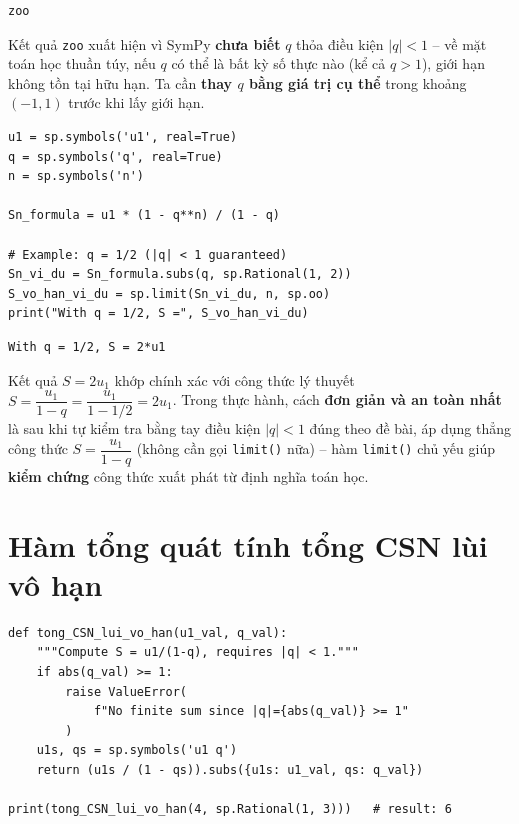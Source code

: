 \documentclass[12pt,a4paper]{report}
\begin{document}
\begin{lstlisting}[style=outstyle,numbers=none]
zoo
\end{lstlisting}

\begin{warnbox}
Kết quả \texttt{zoo} xuất hiện vì SymPy \textbf{chưa biết} $q$ thỏa
điều kiện $|q| < 1$ -- về mặt toán học thuần túy, nếu $q$ có thể là
bất kỳ số thực nào (kể cả $q > 1$), giới hạn không tồn tại hữu hạn. Ta
cần \textbf{thay $q$ bằng giá trị cụ thể} trong khoảng $(-1, 1)$ trước
khi lấy giới hạn.
\end{warnbox}

\begin{lstlisting}[caption={Thay q cụ thể rồi lấy giới hạn}]
u1 = sp.symbols('u1', real=True)
q = sp.symbols('q', real=True)
n = sp.symbols('n')

Sn_formula = u1 * (1 - q**n) / (1 - q)

# Example: q = 1/2 (|q| < 1 guaranteed)
Sn_vi_du = Sn_formula.subs(q, sp.Rational(1, 2))
S_vo_han_vi_du = sp.limit(Sn_vi_du, n, sp.oo)
print("With q = 1/2, S =", S_vo_han_vi_du)
\end{lstlisting}

\begin{lstlisting}[style=outstyle,numbers=none]
With q = 1/2, S = 2*u1
\end{lstlisting}

\begin{infobox}
Kết quả $S = 2u_1$ khớp chính xác với công thức lý thuyết
$S = \dfrac{u_1}{1-q} = \dfrac{u_1}{1 - 1/2} = 2u_1$. Trong thực hành,
cách \textbf{đơn giản và an toàn nhất} là sau khi tự kiểm tra bằng tay
điều kiện $|q| < 1$ đúng theo đề bài, áp dụng thẳng công thức
$S = \dfrac{u_1}{1-q}$ (không cần gọi \texttt{limit()} nữa) -- hàm
\texttt{limit()} chủ yếu giúp \textbf{kiểm chứng} công thức xuất phát
từ định nghĩa toán học.
\end{infobox}

\section{Hàm tổng quát tính tổng CSN lùi vô hạn}

\begin{lstlisting}[caption={Hàm kiểm tra điều kiện và tính tổng}]
def tong_CSN_lui_vo_han(u1_val, q_val):
    """Compute S = u1/(1-q), requires |q| < 1."""
    if abs(q_val) >= 1:
        raise ValueError(
            f"No finite sum since |q|={abs(q_val)} >= 1"
        )
    u1s, qs = sp.symbols('u1 q')
    return (u1s / (1 - qs)).subs({u1s: u1_val, qs: q_val})

print(tong_CSN_lui_vo_han(4, sp.Rational(1, 3)))   # result: 6
\end{lstlisting}
\end{document}

